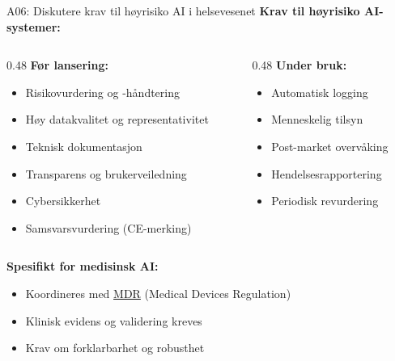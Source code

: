 \documentclass[aspectratio=169, 10pt]{beamer}
\begin{document}
\begin{frame}{A06: Diskutere krav til høyrisiko AI i helsevesenet}
    \textbf{Krav til høyrisiko AI-systemer:}
    
    \vspace{0.3cm}
    \begin{columns}[T]
        \begin{column}{0.48\textwidth}
            \textbf{Før lansering:}
            \begin{itemize}
                \item Risikovurdering og -håndtering
                \item Høy datakvalitet og representativitet
                \item Teknisk dokumentasjon
                \item Transparens og brukerveiledning
                \item Cybersikkerhet
                \item Samsvarsvurdering (CE-merking)
            \end{itemize}
        \end{column}
        \begin{column}{0.48\textwidth}
            \textbf{Under bruk:}
            \begin{itemize}
                \item Automatisk logging
                \item Menneskelig tilsyn
                \item Post-market overvåking
                \item Hendelsesrapportering
                \item Periodisk revurdering
            \end{itemize}
        \end{column}
    \end{columns}
    
    \vspace{0.3cm}
    \textbf{Spesifikt for medisinsk AI:}
    \begin{itemize}
        \item Koordineres med \href{https://eur-lex.europa.eu/legal-content/EN/TXT/?uri=CELEX:32017R0745}{MDR} (Medical Devices Regulation)
        \item Klinisk evidens og validering kreves
        \item Krav om forklarbarhet og robusthet
    \end{itemize}
\end{frame}
\end{document}
